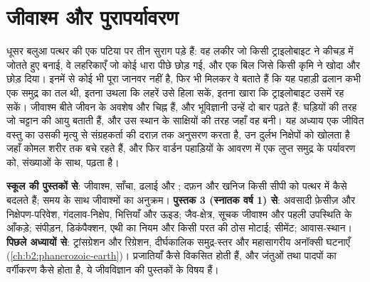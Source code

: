 \chapter{जीवाश्म और पुरापर्यावरण}\label{ch:b2:palaeoenvironments}

धूसर बलुआ पत्थर की एक पटिया पर तीन सुराग पड़े हैं: वह लकीर जो किसी ट्राइलोबाइट ने कीचड़ में जोतते हुए बनाई,
वे लहरिकाएँ जो कोई धारा पीछे छोड़ गई, और एक बिल जिसे किसी कृमि ने खोदा और छोड़ दिया। इनमें से कोई भी
पूरा जानवर नहीं है, फिर भी मिलकर वे बताते हैं कि यह पहाड़ी ढलान कभी एक समुद्र का तल थी, इतना उथला
कि लहरें उसे हिला सकें, इतना खारा कि ट्राइलोबाइट उसमें रह सकें। जीवाश्म बीते जीवन के
अवशेष और चिह्न हैं, और भूविज्ञानी उन्हें दो बार पढ़ते हैं: घड़ियों की तरह जो चट्टान की आयु बताती हैं,
और उस स्थान के साक्षियों की तरह जहाँ वह बनी। यह अध्याय एक जीवित वस्तु का उसकी मृत्यु से
संग्रहकर्ता की दराज़ तक अनुसरण करता है, उन दुर्लभ निक्षेपों को खोलता है जहाँ कोमल शरीर तक बचे रहते हैं, और फिर
वार्डन पहाड़ियों के आवरण में एक लुप्त समुद्र के पर्यावरण को, संख्याओं के साथ, पढ़ता है।

\begin{recall}
\textbf{स्कूल की पुस्तकों से}: जीवाश्म, साँचा, ढलाई और ; दफ़न और खनिज किसी सीपी को
पत्थर में कैसे बदलते हैं; समय के साथ जीवाश्मों का अनुक्रम। \textbf{पुस्तक 3 (स्नातक वर्ष 1) से}:
अवसादी फ़ेसीज़ और निक्षेपण-परिवेश, गंदलाव-निक्षेप, भित्तियाँ और ऊइड; जैव-क्षेत्र, सूचक
जीवाश्म और पहली उपस्थिति के आँकड़े; संपीड़न, डिकंपैक्शन, एथी का नियम और किसी परत की ठोस
मोटाई; सीमेंट; आवास-स्थान। \textbf{पिछले अध्यायों से}: ट्रांसग्रेशन और रिग्रेशन,
दीर्घकालिक समुद्र-स्तर और महासागरीय अनॉक्सी घटनाएँ (\cref{ch:b2:phanerozoic-earth})। प्रजातियाँ
कैसे विकसित होती हैं, और जंतुओं तथा पादपों का वर्गीकरण कैसे होता है, ये जीवविज्ञान की पुस्तकों के विषय हैं।
\end{recall}

